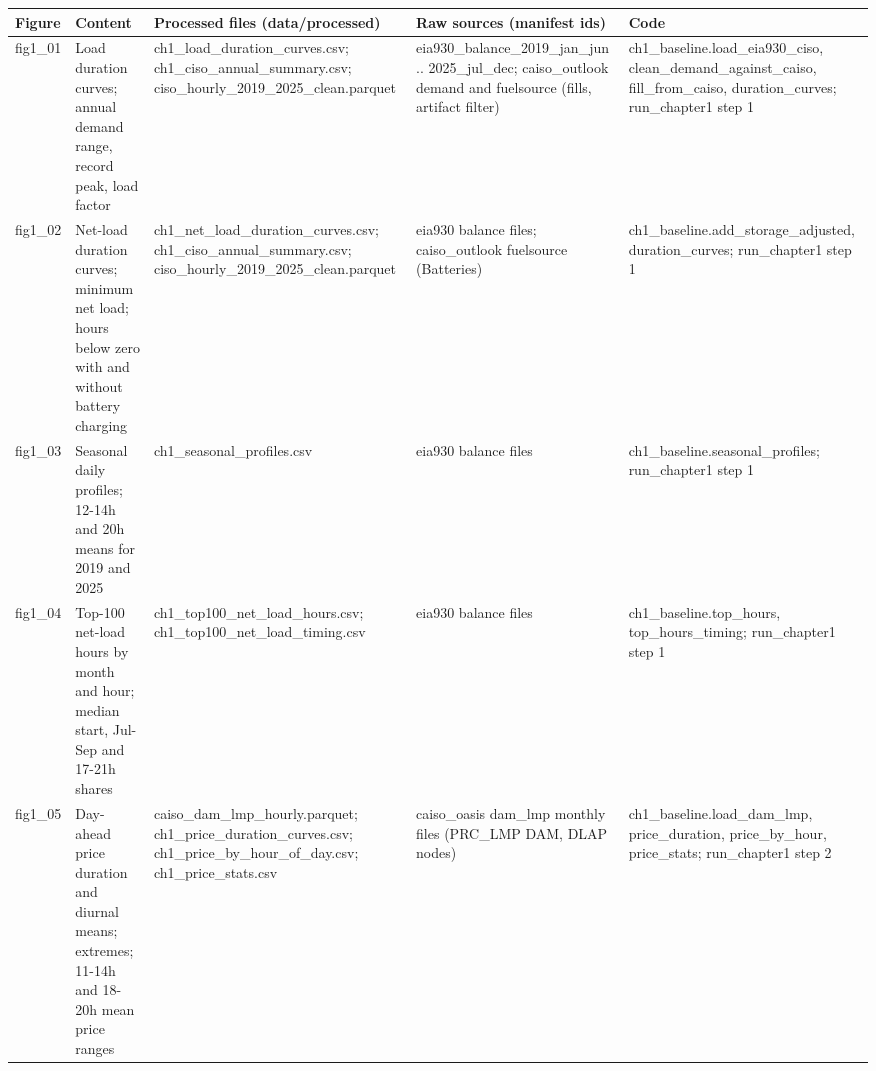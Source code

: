 \begin{tabular}{lp{4.6cm}p{5.2cm}p{4.6cm}p{4.8cm}}
\toprule
Figure & Content & Processed files (data/processed) & Raw sources (manifest ids) & Code \\
\midrule
fig1\_\allowbreak{}01 & Load duration curves; annual demand range, record peak, load factor & ch1\_\allowbreak{}load\_\allowbreak{}duration\_\allowbreak{}curves.csv; ch1\_\allowbreak{}ciso\_\allowbreak{}annual\_\allowbreak{}summary.csv; ciso\_\allowbreak{}hourly\_\allowbreak{}2019\_\allowbreak{}2025\_\allowbreak{}clean.parquet & eia930\_\allowbreak{}balance\_\allowbreak{}2019\_\allowbreak{}jan\_\allowbreak{}jun .. 2025\_\allowbreak{}jul\_\allowbreak{}dec; caiso\_\allowbreak{}outlook demand and fuelsource (fills, artifact filter) & ch1\_\allowbreak{}baseline.load\_\allowbreak{}eia930\_\allowbreak{}ciso, clean\_\allowbreak{}demand\_\allowbreak{}against\_\allowbreak{}caiso, fill\_\allowbreak{}from\_\allowbreak{}caiso, duration\_\allowbreak{}curves; run\_\allowbreak{}chapter1 step 1 \\
fig1\_\allowbreak{}02 & Net-load duration curves; minimum net load; hours below zero with and without battery charging & ch1\_\allowbreak{}net\_\allowbreak{}load\_\allowbreak{}duration\_\allowbreak{}curves.csv; ch1\_\allowbreak{}ciso\_\allowbreak{}annual\_\allowbreak{}summary.csv; ciso\_\allowbreak{}hourly\_\allowbreak{}2019\_\allowbreak{}2025\_\allowbreak{}clean.parquet & eia930 balance files; caiso\_\allowbreak{}outlook fuelsource (Batteries) & ch1\_\allowbreak{}baseline.add\_\allowbreak{}storage\_\allowbreak{}adjusted, duration\_\allowbreak{}curves; run\_\allowbreak{}chapter1 step 1 \\
fig1\_\allowbreak{}03 & Seasonal daily profiles; 12-14h and 20h means for 2019 and 2025 & ch1\_\allowbreak{}seasonal\_\allowbreak{}profiles.csv & eia930 balance files & ch1\_\allowbreak{}baseline.seasonal\_\allowbreak{}profiles; run\_\allowbreak{}chapter1 step 1 \\
fig1\_\allowbreak{}04 & Top-100 net-load hours by month and hour; median start, Jul-Sep and 17-21h shares & ch1\_\allowbreak{}top100\_\allowbreak{}net\_\allowbreak{}load\_\allowbreak{}hours.csv; ch1\_\allowbreak{}top100\_\allowbreak{}net\_\allowbreak{}load\_\allowbreak{}timing.csv & eia930 balance files & ch1\_\allowbreak{}baseline.top\_\allowbreak{}hours, top\_\allowbreak{}hours\_\allowbreak{}timing; run\_\allowbreak{}chapter1 step 1 \\
fig1\_\allowbreak{}05 & Day-ahead price duration and diurnal means; extremes; 11-14h and 18-20h mean price ranges & caiso\_\allowbreak{}dam\_\allowbreak{}lmp\_\allowbreak{}hourly.parquet; ch1\_\allowbreak{}price\_\allowbreak{}duration\_\allowbreak{}curves.csv; ch1\_\allowbreak{}price\_\allowbreak{}by\_\allowbreak{}hour\_\allowbreak{}of\_\allowbreak{}day.csv; ch1\_\allowbreak{}price\_\allowbreak{}stats.csv & caiso\_\allowbreak{}oasis dam\_\allowbreak{}lmp monthly files (PRC\_\allowbreak{}LMP DAM, DLAP nodes) & ch1\_\allowbreak{}baseline.load\_\allowbreak{}dam\_\allowbreak{}lmp, price\_\allowbreak{}duration, price\_\allowbreak{}by\_\allowbreak{}hour, price\_\allowbreak{}stats; run\_\allowbreak{}chapter1 step 2 \\

\end{tabular}
